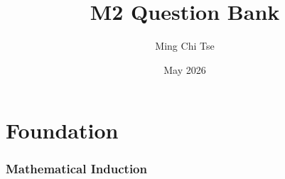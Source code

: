 \documentclass[12pt, a4paper]{article} %
\title{M2 Question Bank}
\author{Ming Chi Tse}
\date{May 2026}
\begin{document}
\maketitle
\newpage %

\tableofcontents 
\newpage %

\part{Foundation}
\section{Mathematical Induction}
\end{document}
